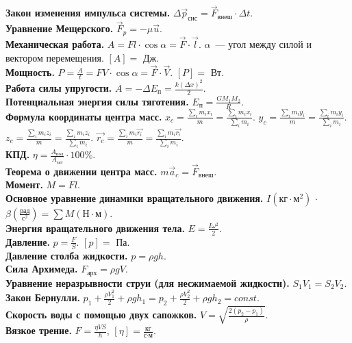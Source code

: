 \documentclass{article}
\begin{document}
	\textbf{Закон изменения импульса системы.} $\varDelta \vec{p}_{\text{сис}} = \vec{F}_{\text{внеш}} \cdot \varDelta t$. \\
	\textbf{Уравнение Мещерского.} $\vec{F}_{p} = -\mu \vec{u}$. \\
	\textbf{Механическая работа.} $A = Fl \cdot \cos \alpha = \vec{F} \cdot \vec{l}$. $\alpha$~--- угол между силой и вектором перемещения. $[A] =$ Дж. \\
	\textbf{Мощность.} $P = \frac{A}{t} = FV \cdot \cos \alpha = \vec{F} \cdot \vec{V}$. $[P] =$ Вт. \\
	\textbf{Работа силы упругости.} $A = -\varDelta E_{\text{п}} = \frac{k (\varDelta x)^2}{2}$. \\
	\textbf{Потенциальная энергия силы тяготения.}
	$E_{\text{п}} = \frac{GM_1M_2}{R}$. \\
	\textbf{Формула координаты центра масс.} $x_c = \frac{\sum\limits_i m_i x_i}{m} = \frac{\sum\limits_i m_i x_i}{\sum\limits_i m_i}$. $y_c = \frac{\sum\limits_i m_i y_i}{m} = \frac{\sum\limits_i m_i y_i}{\sum\limits_i m_i}$. $z_c = \frac{\sum\limits_i m_i z_i}{m} = \frac{\sum\limits_i m_i z_i}{\sum\limits_i m_i}$. $\vec{r_c} = \frac{\sum\limits_i m_i \vec{r_i}}{m} = \frac{\sum\limits_i m_i \vec{r_i}}{\sum\limits_i m_i}$. \\
	\textbf{КПД.} $\eta = \frac{A_{\text{пол}}}{A_{\text{зат}}} \cdot 100\%$. \\
	\textbf{Теорема о движении центра масс.} $m \vec{a}_c = \vec{F}_{\text{внеш}}$. \\
	\textbf{Момент.} $M = Fl$. \\
	\textbf{Основное уравнение динамики вращательного движения.} $I (\text{кг} \cdot \text{м}^2)$ $\cdot$ $\beta (\frac{\text{рад}}{\text{с}^2}) = \sum M (\text{Н} \cdot \text{м})$. \\
	\textbf{Энергия вращательного движения тела.} $E = \frac{I\omega^2}{2}$. \\
	\textbf{Давление.} $p = \frac{F}{S}$. $[p] =$ Па. \\
	\textbf{Давление столба жидкости.} $p = \rho g h$. \\
	\textbf{Сила Архимеда.} $F_{\text{арх}} = \rho g V$. \\
	\textbf{Уравнение неразрывности струи (для несжимаемой жидкости).} $S_1V_1 = S_2V_2$. \\
	\textbf{Закон Бернулли.} $p_1 + \frac{\rho V_1^2}{2} + \rho g h_1 = p_2 + \frac{\rho V_2^2}{2} + \rho g h_2 = const$. \\
	\textbf{Скорость воды с помощью двух сапожков.} $V = \sqrt{\frac{2(p_2 - p_1)}{\rho}}$. \\
	\textbf{Вязкое трение.}	$F = \frac{\eta V S}{h}$, $[\eta] = \frac{\text{кг}}{\text{с} \cdot \text{м}}$.
\end{document}
